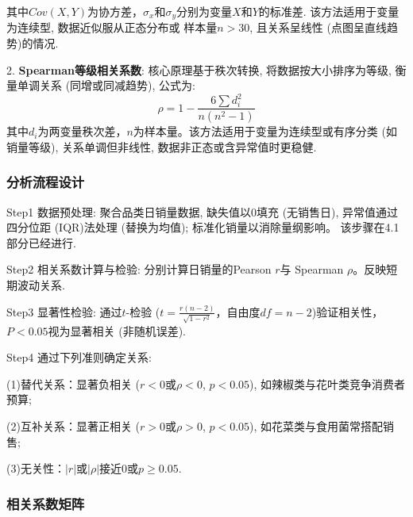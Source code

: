 \documentclass{cumcmthesis}
\begin{document}
其中$Cov(X,Y)$为协方差，$\sigma_x$和$\sigma_y$分别为变量$X$和$Y$的标准差.  
该方法适用于变量为连续型, 数据近似服从正态分布或
样本量$n>30$, 且关系呈线性 (点图呈直线趋势)的情况.


2. \textbf{Spearman等级相关系数}:   
核心原理基于秩次转换, 将数据按大小排序为等级, 衡量单调关系 (同增或同减趋势), 公式为: 
\begin{equation}
\rho=1-\frac{6\sum d_i^2}{n(n^2-1)}
\end{equation}  
其中$d_i$为两变量秩次差，$n$为样本量。该方法适用于变量为连续型或有序分类
 (如销量等级), 关系单调但非线性, 数据非正态或含异常值时更稳健.

\subsubsection{分析流程设计}
    Step1 数据预处理: 聚合品类日销量数据, 缺失值以0填充 (无销售日), 
    异常值通过四分位距 (IQR)法处理 (替换为均值); 标准化销量以消除量纲影响。
    该步骤在4.1部分已经进行.
   
    Step2 相关系数计算与检验: 分别计算日销量的Pearson $r$与
    Spearman $\rho$。反映短期波动关系.
    
    Step3 显著性检验: 通过$t$-检验 
    ($t=\frac{r(n-2)}{\sqrt{1-r^2}}$，自由度$df=n-2$)验证相关性，
    $P<0.05$视为显著相关 (非随机误差).
    
    Step4 通过下列准则确定关系: 
   
    (1)替代关系：显著负相关 ($r<0$或$\rho<0$, $p<0.05$), 如辣椒类与花叶类竞争消费者预算; 

    (2)互补关系：显著正相关 ($r>0$或$\rho>0$, $p<0.05$), 如花菜类与食用菌常搭配销售;  

    (3)无关性：$|r|$或$|\rho|$接近0或$p≥0.05$.


\subsubsection{相关系数矩阵} 
\end{document}
